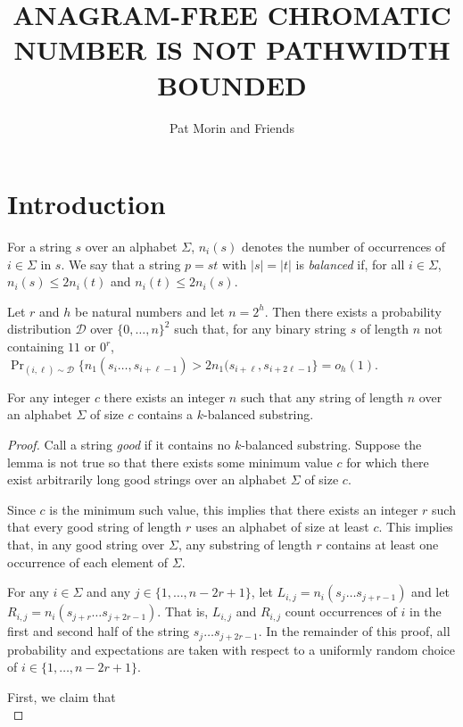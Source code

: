 \documentclass{patmorin}
\title{\MakeUppercase{Anagram-Free Chromatic Number is not Pathwidth Bounded}}
\author{Pat Morin and Friends}%
\begin{document}
\maketitle
%
\begin{abstract}
\end{abstract}
%
%


\section{Introduction}

For a string $s$ over an alphabet $\Sigma$, $n_i(s)$ denotes the number
of occurrences of $i\in\Sigma $ in $s$.  We say that a string $p=st$ with
$|s|=|t|$ is \emph{balanced} if, for all $i\in\Sigma$, $n_i(s)\le 2n_i(t)$
and $n_i(t)\le 2n_i(s)$.




\begin{lem}
  Let $r$ and $h$ be natural numbers and let $n=2^h$. Then there
  exists a probability distribution $\mathcal{D}$ over $\{0,\ldots,n\}^2$ such that, for any binary string $s$ of length $n$ not containing $11$ or $0^r$,
  $\Pr_{(i,\ell)\sim\mathcal{D}}\{n_1(s_i\ldots,s_{i+\ell-1}) > 2n_1(s_{i+\ell},s_{i+2\ell-1} \} = o_h(1)$.
\end{lem}

\begin{lem}
  For any integer $c$ there exists an integer $n$ such
  that any string of length $n$ over an alphabet $\Sigma$ of size $c$
  contains a $k$-balanced substring.
\end{lem}

\begin{proof}
  Call a string \emph{good} if it contains no $k$-balanced substring.
  Suppose the lemma is not true so that there exists some minimum value
  $c$ for which there exist arbitrarily long good strings over an alphabet
  $\Sigma$ of size $c$.  

  Since $c$ is the minimum such value, this implies that there exists an
  integer $r$ such that every good string of length $r$ uses an alphabet
  of size at least $c$.  This implies that, in any good string over
  $\Sigma$, any substring of length $r$ contains at least one occurrence
  of each element of $\Sigma$.

  For any $i\in\Sigma$ and any $j\in\{1,\ldots,n-2r+1\}$, let
  $L_{i,j}=n_i(s_{j}\ldots s_{j+r-1})$ and let $R_{i,j}=n_i(s_{j+r}\ldots
  s_{j+2r-1})$.  That is, $L_{i,j}$ and $R_{i,j}$ count occurrences of $i$
  in the first and second half of the string $s_{j}\ldots s_{j+2r-1}$. In the remainder of this proof, all probability and expectations are taken with respect to a uniformly random choice of $i\in\{1,\ldots,n-2r+1\}$.

  First, we claim that
  \begin{equation}
    
  \end{equation}

\end{proof}
\end{document}
